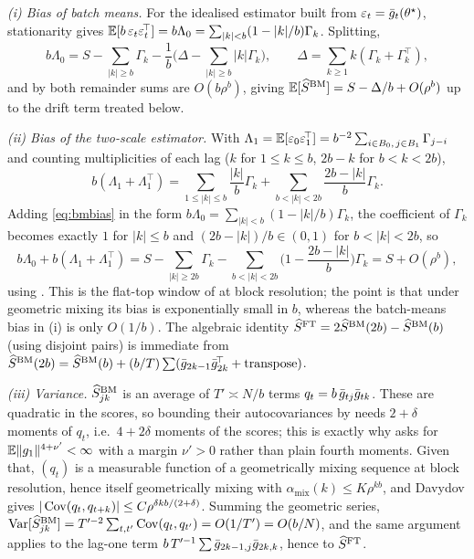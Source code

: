 \emph{(i) Bias of batch means.} For the idealised estimator built from $\varepsilon_t=\bar{g}_t(\theta^\star)$,
stationarity gives $\mathbb{E}[b\,\varepsilon_t\varepsilon_t^{\!\top}]
=b\Lambda_0=\sum_{|k|<b}(1-|k|/b)\Gamma_k$. Splitting,
\begin{equation}
b\Lambda_0=S-\sum_{|k|\ge b}\Gamma_k-\frac1b\Big(\Delta-\sum_{|k|\ge b}|k|\Gamma_k\Big),
\qquad \Delta=\sum_{k\ge1}k(\Gamma_k+\Gamma_k^{\!\top}),
\label{eq:bmbias}
\end{equation}
and by  both remainder sums are $O(b\rho^{b})$, giving
$\mathbb{E}[\widehat{S}^{\mathrm{BM}}]=S-\Delta/b+O(\rho^{b})$ up to the drift term treated below.

\emph{(ii) Bias of the two-scale estimator.} With
$\Lambda_1=\mathbb{E}[\varepsilon_0\varepsilon_1^{\!\top}]=b^{-2}\sum_{i\in B_0,\,j\in B_1}\Gamma_{j-i}$
and counting multiplicities of each lag ($k$ for $1\le k\le b$, $2b-k$ for $b<k<2b$),
\begin{equation}
b(\Lambda_1+\Lambda_1^{\!\top})
=\sum_{1\le|k|\le b}\frac{|k|}{b}\Gamma_k+\sum_{b<|k|<2b}\frac{2b-|k|}{b}\Gamma_k .
\end{equation}
Adding \eqref{eq:bmbias} in the form $b\Lambda_0=\sum_{|k|<b}(1-|k|/b)\Gamma_k$, the
coefficient of $\Gamma_k$ becomes exactly $1$ for $|k|\le b$ and $(2b-|k|)/b\in(0,1)$ for
$b<|k|<2b$, so
\begin{equation}
b\Lambda_0+b(\Lambda_1+\Lambda_1^{\!\top})
=S-\sum_{|k|\ge2b}\Gamma_k-\sum_{b<|k|<2b}\Big(1-\frac{2b-|k|}{b}\Big)\Gamma_k
=S+O(\rho^{b}),
\end{equation}
using . This is the flat-top window of \citet{politis1995bias} at block
resolution; the point is that under geometric mixing its bias is exponentially small in
$b$, whereas the batch-means bias in (i) is only $O(1/b)$. The algebraic identity
$\widehat{S}^{\mathrm{FT}}=2\widehat{S}^{\mathrm{BM}}(2b)-\widehat{S}^{\mathrm{BM}}(b)$ (using disjoint pairs) is immediate from
$\widehat{S}^{\mathrm{BM}}(2b)=\widehat{S}^{\mathrm{BM}}(b)+ (b/T)\sum(\bar{g}_{2k-1}\bar{g}_{2k}^{\!\top}+\text{transpose})$.

\emph{(iii) Variance.} $\widehat{S}^{\mathrm{BM}}_{jk}$ is an average of $T'\asymp N/b$ terms
$q_t=b\,\bar{g}_{tj}\bar{g}_{tk}$. These are quadratic in the scores, so bounding their autocovariances
by  needs $2+\delta$ moments of $q_t$, i.e.\ $4+2\delta$ moments of the
scores; this is exactly why  asks for $\mathbb{E}\lVert g_1 \rVert^{4+\nu'}<\infty$ with a margin
$\nu'>0$ rather than plain fourth moments. Given that, $(q_t)$ is a measurable function of a
geometrically mixing sequence at block resolution, hence itself geometrically mixing with
$\alpha_{\mathrm{mix}}(k)\le K\rho^{kb}$, and Davydov gives
$|\operatorname{Cov}(q_t,q_{t+k})|\le C\rho^{\delta kb/(2+\delta)}$. Summing the geometric series,
$\operatorname{Var}[\widehat{S}^{\mathrm{BM}}_{jk}]=T'^{-2}\sum_{t,t'}\operatorname{Cov}(q_t,q_{t'})=O(1/T')=O(b/N)$, and the same argument
applies to the lag-one term $b\,T'^{-1}\sum\bar{g}_{2k-1,j}\bar{g}_{2k,k}$, hence to $\widehat{S}^{\mathrm{FT}}$.

